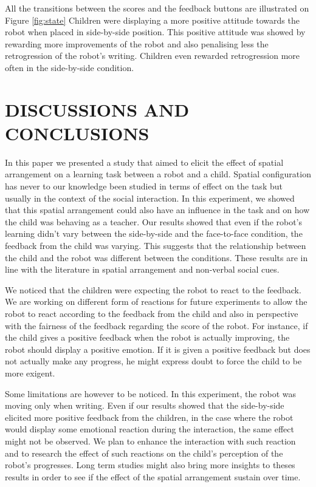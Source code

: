 \documentclass[letterpaper, 10 pt, conference]{ieeeconf}  %
\begin{document}
All the transitions between the scores and the feedback buttons are illustrated on Figure \ref{fig:state}
Children were displaying a more positive attitude towards the robot when placed in side-by-side position.
This positive attitude was showed by rewarding more improvements of the robot and also penalising less the retrogression of the robot's writing.
Children even rewarded retrogression more often in the side-by-side condition.



\section{DISCUSSIONS AND CONCLUSIONS}
In this paper we presented a study that aimed to elicit the effect of spatial arrangement on a learning task between a robot and a child.
Spatial configuration has never to our knowledge been studied in terms of effect on the task but usually in the context of the social interaction.
In this experiment, we showed that this spatial arrangement could also have an influence in the task and on how the child was behaving as a teacher.
Our results showed that even if the robot's learning didn't vary between the side-by-side and the face-to-face condition, the feedback from the child was varying.
This suggests that the relationship between the child and the robot was different between the conditions.
These results are in line with the literature in spatial arrangement and non-verbal social cues.

We noticed that the children were expecting the robot to react to the feedback.
We are working on different form of reactions for future experiments to allow the robot to react according to the feedback from the child and also in perspective with the fairness of the feedback regarding the score of the robot.
For instance, if the child gives a positive feedback when the robot is actually improving, the robot should display a positive emotion.
If it is given a positive feedback but does not actually make any progress, he might express doubt to force the child to be more exigent. 

Some limitations are however to be noticed. 
In this experiment, the robot was moving only when writing. 
Even if our results showed that the side-by-side elicited more positive feedback from the children, in the case where the robot would display some emotional reaction during the interaction, the same effect might not be observed. 
We plan to enhance the interaction with such reaction and to research the effect of such reactions on the child's perception of the robot's progresses. 
Long term studies might also bring more insights to theses results in order to see if the effect of the spatial arrangement sustain over time.
\end{document}

